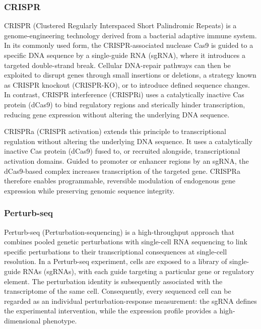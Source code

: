 \documentclass[11pt,a4paper]{article}
\begin{document}
\subsubsection{CRISPR}

CRISPR (Clustered Regularly Interspaced Short Palindromic Repeats) is a genome-engineering technology derived from a bacterial adaptive immune system. In its commonly used form, the CRISPR-associated nuclease Cas9 is guided to a specific DNA sequence by a single-guide RNA (sgRNA), where it introduces a targeted double-strand break. Cellular DNA-repair pathways can then be exploited to disrupt genes through small insertions or deletions, a strategy known as CRISPR knockout (CRISPR-KO), or to introduce defined sequence changes. In contrast, CRISPR interference (CRISPRi) uses a catalytically inactive Cas protein (dCas9) to bind regulatory regions and sterically hinder transcription, reducing gene expression without altering the underlying DNA sequence.

CRISPRa (CRISPR activation) extends this principle to transcriptional regulation without altering the underlying DNA sequence. It uses a catalytically inactive Cas protein (dCas9) fused to, or recruited alongside, transcriptional activation domains. Guided to promoter or enhancer regions by an sgRNA, the dCas9-based complex increases transcription of the targeted gene. CRISPRa therefore enables programmable, reversible modulation of endogenous gene expression while preserving genomic sequence integrity.

\subsubsection{Perturb-seq}

Perturb-seq (Perturbation-sequencing) is a high-throughput approach that combines pooled genetic perturbations with single-cell RNA sequencing to link specific perturbations to their transcriptional consequences at single-cell resolution. In a Perturb-seq experiment, cells are exposed to a library of single-guide RNAs
(sgRNAs), with each guide targeting a particular gene or regulatory element.
The perturbation identity is subsequently associated with the transcriptome of
the same cell. Consequently, every sequenced cell can be regarded as an
individual perturbation-response measurement: the sgRNA defines the
experimental intervention, while the expression profile provides a
high-dimensional phenotype. 
\end{document}
